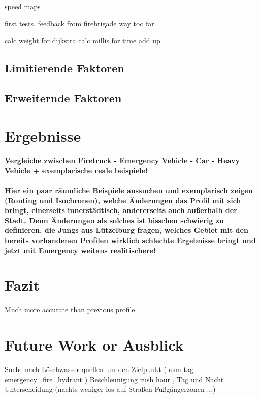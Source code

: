 \documentclass[10pt,a4paper]{article}
\begin{document}
speed maps

first tests, feedback from firebrigade
way too far.

calc weight for dijkstra
calc millis for time add up



\subsection{Limitierende Faktoren}

\subsection{Erweiternde Faktoren}

\section{Ergebnisse}
\paragraph{
Vergleiche zwischen Firetruck - Emergency Vehicle - Car - Heavy Vehicle
+ exemplarische reale beispiele!
}
\paragraph{
\color{red}
Hier ein paar räumliche Beispiele aussuchen und exemplarisch zeigen (Routing und Isochronen), welche Änderungen das Profil mit sich bringt, einerseits innerstädtisch, andererseits auch außerhalb der Stadt. Denn Änderungen als solches ist bisschen schwierig zu definieren. die Jungs aus Lützelburg fragen, welches Gebiet mit den bereits vorhandenen Profilen wirklich schlechte Ergebnisse bringt und jetzt mit Emergency weitaus realitischere!
}

\section{Fazit}

Much more accurate than previous profile. 

\section{Future Work or Ausblick}

Suche nach Löschwasser quellen um den Zielpunkt ( osm tag emergency=fire\_hydrant )
Beschleunigung
rush hour , Tag und Nacht Unterscheidung (nachts weniger los auf Straßen\/ Fußgängerzonen ...)

\printbibliography
\end{document}
